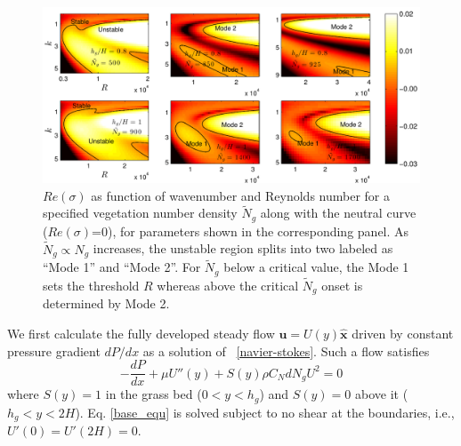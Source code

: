 \documentclass[aps,prl,twocolumn,superscriptaddress,sort&compress,10pt]{revtex4-1}  %
\newcommand{\bu}{\mathbf{u}}
\newcommand{\hg}{h_g}
\newcommand{\Rey}{{R}}
\newcommand{\Ndg}{\tilde{N}_g}
\begin{document}
\begin{figure}
 \includegraphics[width=\textwidth]{SetAll_imgsc}

\caption{$Re(\sigma)$ as function of wavenumber and Reynolds number for a specified vegetation number density $\Ndg$ along with the neutral curve ($Re(\sigma)$=0), for parameters shown in the corresponding panel.  
As $\Ndg \propto N_g$ increases, the unstable region splits into two labeled as ``Mode 1'' and ``Mode 2''. 
For $\Ndg$ below a critical value, the Mode 1 sets the threshold $\Rey$ whereas above the critical $\Ndg$ onset is determined by Mode 2.}
\label{K_Re_sigma_set3}
\end{figure}
We first calculate the fully developed steady flow $\bu = U(y)\boldsymbol{\hat{x}}$ driven by constant pressure gradient $dP/dx$ as a solution of ~\eqref{navier-stokes}. 
Such a flow satisfies 
\begin{equation}
 -\frac{dP}{dx}+\mu U''(y) +S(y) \rho C_N d N_gU^2=0
\label{base_equ}
\end{equation}
where $S(y)=1$ in the grass bed ($0<y<\hg$) and $S(y)=0$ above it ($\hg< y< 2H$). 
Eq. \eqref{base_equ} is solved subject to no shear at the boundaries, i.e., $U'(0) = U'(2H) = 0$.
\end{document}
